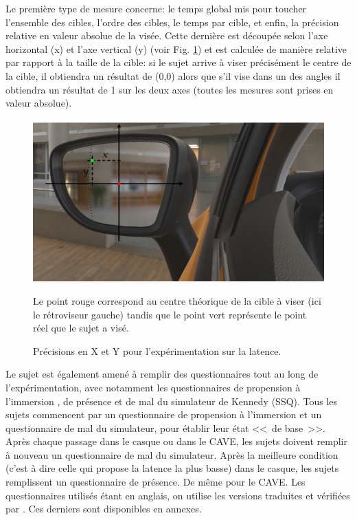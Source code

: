 	\par Le première type de mesure concerne: le temps global mis pour toucher l'ensemble des cibles, l'ordre des cibles, le temps par cible, et enfin, la précision relative en valeur absolue de la visée. Cette dernière est découpée selon l'axe horizontal (x) et l'axe vertical (y) (voir Fig. \ref{fig:x_y_precision_latency}) et est calculée de manière relative par rapport à la taille de la cible: si le sujet arrive à viser précisément le centre de la cible, il obtiendra un résultat de (0,0) alors que s'il vise dans un des angles il obtiendra un résultat de 1 sur les deux axes (toutes les mesures sont prises en valeur absolue).
	
	\begin{figure}
		\centering
		\includegraphics[scale=.65]{Figures/XYPrecision}
		\caption{Précisions en X et Y pour l'expérimentation sur la latence.}{Le point rouge correspond au centre théorique de la cible à viser (ici le rétroviseur gauche) tandis que le point vert représente le point réel que le sujet a visé.}
		\label{fig:x_y_precision_latency}
	\end{figure}
	
	\par Le sujet est également amené à remplir des questionnaires tout au long de l'expérimentation, avec notamment les questionnaires de propension à l'immersion \citep{witmer_measuring_1998}, de présence \citep{witmer_measuring_1998} et de mal du simulateur de Kennedy (SSQ). Tous les sujets commencent par un questionnaire de propension à l'immersion et un questionnaire de mal du simulateur, pour établir leur état <<~de base~>>. Après chaque passage dans le casque ou dans le CAVE, les sujets doivent remplir à nouveau un questionnaire de mal du simulateur. Après la meilleure condition (c'est à dire celle qui propose la latence la plus basse) dans le casque, les sujets remplissent un questionnaire de présence. De même pour le CAVE. Les questionnaires utilisés étant en anglais, on utilise les versions traduites et vérifiées par \cite{bouchard_revising_2007, bouchard_side_2009, bouchard_exploring_2011}. Ces derniers sont disponibles en annexes.
	
